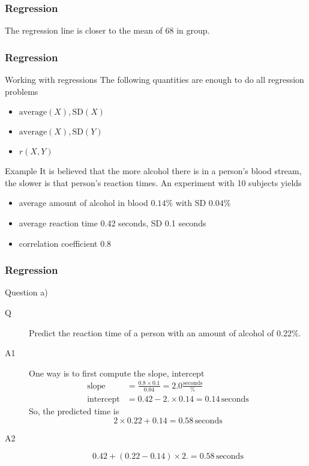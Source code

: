 \documentclass[handout]{beamer}
\begin{document}
   \begin{frame}
   \frametitle{Regression}
   \begin{center}
   \end{center}
   The regression line is closer to the mean of 68 in group.
   \end{frame}


   \begin{frame} \frametitle{Regression}

   \begin{block}
   {Working with regressions}
   The following quantities are enough to do all
   regression problems
   \begin{itemize}
   \item $\text{average}(X), \text{SD}(X)$
   \item $\text{average}(X), \text{SD}(Y)$
   \item $r(X,Y)$
   \end{itemize}
   \end{block}

   \begin{block}
   {Example}
   It is believed that the more alcohol there is in a person's blood
   stream, the slower is that person's reaction times.
   An experiment with 10 subjects yields
   \begin{itemize}
   \item average amount of alcohol in blood $0.14\%$ with SD $0.04\%$
   \item average reaction time 0.42 seconds, SD 0.1 seconds
   \item correlation coefficient 0.8
   \end{itemize}
   \end{block}
   \end{frame}


   \begin{frame} \frametitle{Regression}

   \begin{block}
   {Question a)}
   \begin{description}
   \item[Q] Predict the reaction time of a person with an amount
   of alcohol of 0.22\%.
   \item[A1] One way is to first compute the slope, intercept
   $$
   \begin{aligned}
   \text{slope} &= \frac{0.8 \times 0.1}{0.04} = 2.0 \frac{\text{seconds}}{\%}     \\
   \text{intercept} &= 0.42 - 2. \times 0.14 = 0.14 \, \text{seconds}
   \end{aligned}
   $$
   So, the predicted time is
   $$
   2 \times 0.22 + 0.14 = 0.58 \, \text{seconds}
   $$
   \item[A2]
   $$
   0.42 + (0.22 - 0.14) \times 2. = 0.58 \, \text{seconds}
   $$
   \end{description}
   \end{block}
   \end{frame}
\end{document}
